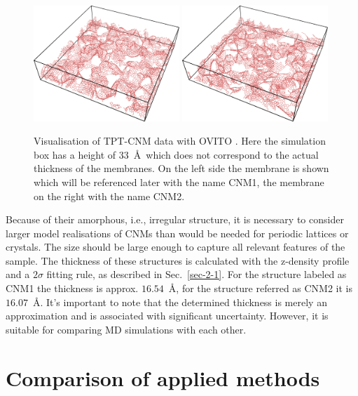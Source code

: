 \documentclass[preprint,12pt]{elsarticle}
\begin{document}
\begin{figure}[ht!]
\centering
\includegraphics[width=0.49\textwidth]{YM4CNM-f-3a.png}
\includegraphics[width=0.49\textwidth]{YM4CNM-f-3b.png}
\caption{Visualisation of TPT-CNM data with OVITO \cite{ovito}. 
Here the simulation box has a height of 33~\AA\, which does not correspond 
to the actual thickness of the membranes. On the left side the membrane is shown 
which will be referenced later with the name CNM1, 
the membrane on the right with the name CNM2.\label{CNM}}
\end{figure}

Because of their amorphous, i.e., irregular structure, 
it is necessary to consider larger model realisations of 
CNMs than would be needed for periodic lattices or crystals.
The size should be large enough to capture all relevant features of the sample.
The thickness of these structures is calculated with the z-density profile 
and a $2\sigma$ fitting rule, as described in Sec.~\ref{sec-2-1}. 
For the structure labeled as CNM1 the thickness is approx. $16.54$~\AA, 
for the structure referred as CNM2 it is $16.07$~\AA. 
It's important to note that the determined thickness is merely an approximation 
and is associated with significant uncertainty. 
However, it is suitable for comparing MD simulations with each other. 



\section{Comparison of applied methods}
\label{sec-3}
\end{document}
